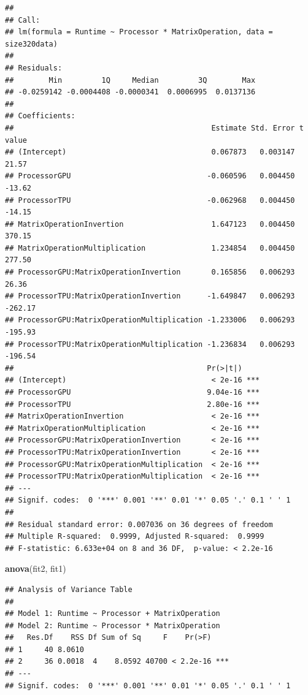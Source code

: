 \documentclass[
]{article}
\newenvironment{Shaded}{\begin{snugshade}}{\end{snugshade}}
\newcommand{\KeywordTok}[1]{\textcolor[rgb]{0.13,0.29,0.53}{\textbf{#1}}}
\newcommand{\NormalTok}[1]{#1}
\begin{document}
\begin{verbatim}
## 
## Call:
## lm(formula = Runtime ~ Processor * MatrixOperation, data = size320data)
## 
## Residuals:
##        Min         1Q     Median         3Q        Max 
## -0.0259142 -0.0004408 -0.0000341  0.0006995  0.0137136 
## 
## Coefficients:
##                                             Estimate Std. Error t value
## (Intercept)                                 0.067873   0.003147   21.57
## ProcessorGPU                               -0.060596   0.004450  -13.62
## ProcessorTPU                               -0.062968   0.004450  -14.15
## MatrixOperationInvertion                    1.647123   0.004450  370.15
## MatrixOperationMultiplication               1.234854   0.004450  277.50
## ProcessorGPU:MatrixOperationInvertion       0.165856   0.006293   26.36
## ProcessorTPU:MatrixOperationInvertion      -1.649847   0.006293 -262.17
## ProcessorGPU:MatrixOperationMultiplication -1.233006   0.006293 -195.93
## ProcessorTPU:MatrixOperationMultiplication -1.236834   0.006293 -196.54
##                                            Pr(>|t|)    
## (Intercept)                                 < 2e-16 ***
## ProcessorGPU                               9.04e-16 ***
## ProcessorTPU                               2.80e-16 ***
## MatrixOperationInvertion                    < 2e-16 ***
## MatrixOperationMultiplication               < 2e-16 ***
## ProcessorGPU:MatrixOperationInvertion       < 2e-16 ***
## ProcessorTPU:MatrixOperationInvertion       < 2e-16 ***
## ProcessorGPU:MatrixOperationMultiplication  < 2e-16 ***
## ProcessorTPU:MatrixOperationMultiplication  < 2e-16 ***
## ---
## Signif. codes:  0 '***' 0.001 '**' 0.01 '*' 0.05 '.' 0.1 ' ' 1
## 
## Residual standard error: 0.007036 on 36 degrees of freedom
## Multiple R-squared:  0.9999, Adjusted R-squared:  0.9999 
## F-statistic: 6.633e+04 on 8 and 36 DF,  p-value: < 2.2e-16
\end{verbatim}

\begin{Shaded}
\begin{Highlighting}[]
\KeywordTok{anova}\NormalTok{(fit2, fit1)}
\end{Highlighting}
\end{Shaded}

\begin{verbatim}
## Analysis of Variance Table
## 
## Model 1: Runtime ~ Processor + MatrixOperation
## Model 2: Runtime ~ Processor * MatrixOperation
##   Res.Df    RSS Df Sum of Sq     F    Pr(>F)    
## 1     40 8.0610                                 
## 2     36 0.0018  4    8.0592 40700 < 2.2e-16 ***
## ---
## Signif. codes:  0 '***' 0.001 '**' 0.01 '*' 0.05 '.' 0.1 ' ' 1
\end{verbatim}
\end{document}
